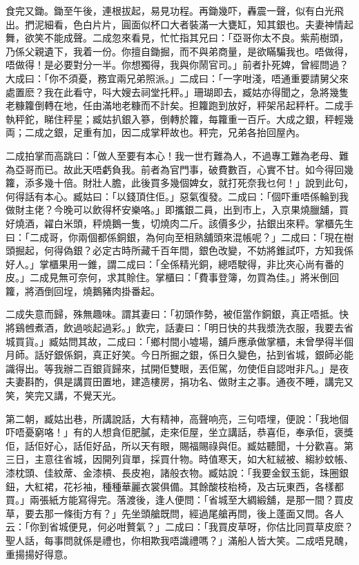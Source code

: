 \documentclass[a5paper, 12pt, openany]{book} %
\begin{document}
	食完又鋤。鋤至午後，連根拔起，易見功程。再鋤幾吓，轟震一聲，似有白光飛出。捫泥細看，色白片片，圓面似杯口大者裝滿一大甕缸，知其銀也。夫妻神情起舞，欲笑不能成聲。二成忽來看見，忙忙指其兄曰：「亞哥你太不良。紫荊樹頭，乃係父親遺下，我着一份。你擅自鋤掘，而不與弟商量，是欲瞞騙我也。唔做得，唔做得！是必要對分一半。你想獨得，我與你鬧官司。」前者扑死婢，曾經問過？大成曰：「你不須憂，務宜兩兄弟照派。」二成曰：「一字咁淺，唔通重要請舅父來處置麽？我在此看守，呌大嫂去祠堂托秤。」珊瑚即去，臧姑亦得聞之，急將幾隻老糠籮倒轉在地，任由滿地老糠而不計矣。担籮跑到放好，秤架吊起秤杆。二成手執秤鉈，睇住秤星；臧姑扒銀入篸，倒轉於籮，每籮重一百斤。大成之銀，秤輕幾両；二成之銀，足重有加，因二成掌秤故也。秤完，兄弟各抬回屋內。

	二成拍掌而高跳曰：「做人至要有本心！我一世冇難為人，不過專工難為老母、難為亞哥而已。故此天唔虧負我。前者為官門事，破費數百，心實不甘。如今得回幾籮，添多幾十倍。財壯人膽，此後買多幾個婢女，就打死奈我乜何！」說到此句，何得話有本心。臧姑曰：「以錢頂住佢。」惡氣復發。二成曰：「個吓重唔係輪到我做財主佬？今晚可以飲得杯安樂咯。」即攜銀二員，出到市上，入京果燒臘舖，買好燒酒，糴白米頭，秤燒鵝一隻，切燒肉二斤。該價多少，拈銀出來秤。掌櫃先生曰：「二成哥，你兩個都係銅銀，為何向至相熟舖頭來混帳呢？」二成曰：「現在樹頭掘起，何得偽銀？必定古時所藏千百年間，銀色改變，不妨將錐試吓，方知我係好人。」掌櫃果用一錐，謂二成曰：「全係精光銅，總唔駛得，非比夾心尚有番的皮。」二成見無可奈何，求其賒住。掌櫃曰：「費事登簿，勿買為佳。」將米倒回籮，將酒倒回埕，燒鵝豬肉掛番起。

	二成失意而歸，殊無趣味。謂其妻曰：「初頭作勢，被佢當作銅銀，真正唔抵。快將鷄乸煮酒，飲過啖起過彩。」飲完，話妻曰：「明日快的共我漿洗衣服，我要去省城買貨。」臧姑問其故，二成曰：「鄉村間小墟場，舖戶應承做掌櫃，未曾學得半個月師。話好銀係銅，真正好笑。今日所掘之銀，係日久變色，拈到省城，銀師必能識得出。等我辦二百銀貨歸來，拭開佢雙眼，丟佢駕，勿使佢自認咁非凡。」是夜夫妻斟酌，俱是講買田置地，建造樓房，捐功名、做財主之事。通夜不睡，講完又笑，笑完又講，不覺天光。

	第二朝，臧姑出巷，所講說話，大有精神，高聲响亮，三句唔埋，便說：「我地個吓唔憂窮咯！」有的人想貪佢肥膩，走來佢屋，坐立講話，恭喜佢，奉承佢，褒獎佢，話佢好心，話佢好品，所以天有眼，賜福賜祿與佢。臧姑聽聞，十分歡喜。第三日，主意往省城，因開列貨單，採買什物。時值寒天，如大紅絨被、縐紗蚊帳、漆枕頭、佳紋蓆、金漆槓、長皮袍，諸般衣物。臧姑說：「我要金釵玉鈪，珠圈銀鈕，大紅裙，花衫袖，種種華麗衣裳俱備。其餘酸枝枱椅，及古玩東西，各樣都買。」兩張紙方能寫得完。落渡後，逢人便問：「省城至大綢緞舖，是那一間？買皮草，要去那一條街方有？」先坐頭艙既問，經過尾艙再問，後上蓬面又問。各人云：「你到省城便見，何必咁贅氣？」二成曰：「我買皮草呀，你估比同買草皮麽？聖人話，每事問就係是禮也，你相欺我唔識禮嗎？」滿船人皆大笑。二成唔見醜，重揚揚好得意。
\end{document}
